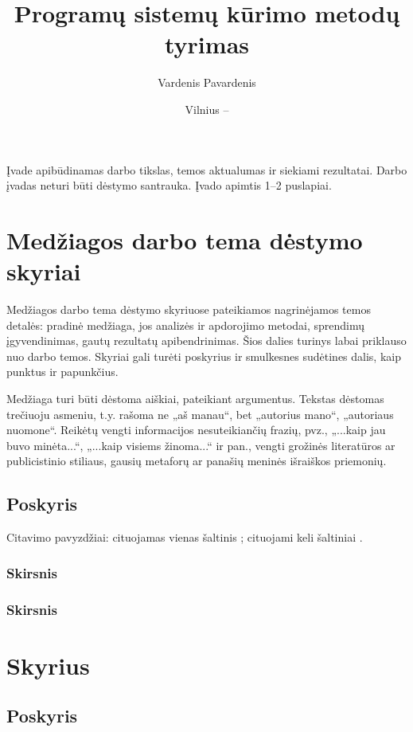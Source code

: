 \documentclass{VUMIFPSkursinis}
\title{Programų sistemų kūrimo metodų tyrimas}
\author{Vardenis Pavardenis}
\date{Vilnius – \the\year}
\begin{document}
\maketitle

\tableofcontents

Įvade apibūdinamas darbo tikslas, temos aktualumas ir siekiami rezultatai.
Darbo įvadas neturi būti dėstymo santrauka. Įvado apimtis 1–2 puslapiai.

\section{Medžiagos darbo tema dėstymo skyriai}
Medžiagos darbo tema dėstymo skyriuose pateikiamos nagrinėjamos temos detalės:
pradinė medžiaga, jos analizės ir apdorojimo metodai, sprendimų įgyvendinimas,
gautų rezultatų apibendrinimas. Šios dalies turinys labai priklauso nuo darbo
temos. Skyriai gali turėti poskyrius ir smulkesnes sudėtines dalis, kaip
punktus ir papunkčius.

Medžiaga turi būti dėstoma aiškiai, pateikiant argumentus. Tekstas dėstomas
trečiuoju asmeniu, t.y. rašoma ne „aš manau“, bet „autorius mano“, „autoriaus
nuomone“. Reikėtų vengti informacijos nesuteikiančių frazių, pvz., „...kaip jau
buvo minėta...“, „...kaip visiems žinoma...“ ir pan., vengti grožinės literatūros
ar publicistinio stiliaus, gausių metaforų ar panašių meninės išraiškos
priemonių.

\subsection{Poskyris}
Citavimo pavyzdžiai: cituojamas vienas šaltinis \cite{PvzStraipsnLt}; cituojami
keli šaltiniai \cite{PvzStraipsnEn, PvzKonfLt, PvzKonfEn, PvzKnygLt, PvzKnygEn,
PvzElPubLt, PvzElPubEn, PvzMagistrLt, PvzPhdEn}.

\subsubsection{Skirsnis}
\subsubsection{Skirsnis}
\section{Skyrius}
\subsection{Poskyris}
\end{document}
